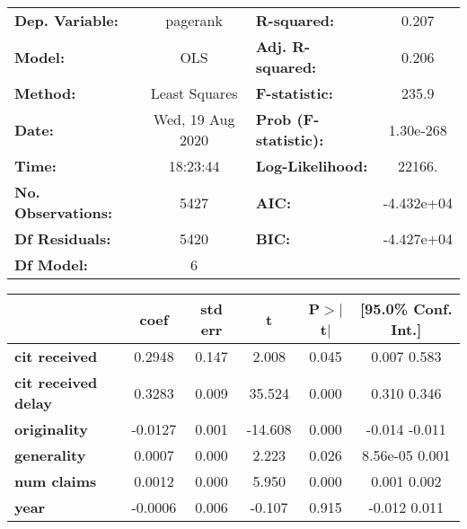 \begin{center}
\begin{tabular}{lclc}
\toprule
\textbf{Dep. Variable:}     &     pagerank     & \textbf{  R-squared:         } &      0.207    \\
\textbf{Model:}             &       OLS        & \textbf{  Adj. R-squared:    } &      0.206    \\
\textbf{Method:}            &  Least Squares   & \textbf{  F-statistic:       } &      235.9    \\
\textbf{Date:}              & Wed, 19 Aug 2020 & \textbf{  Prob (F-statistic):} &  1.30e-268    \\
\textbf{Time:}              &     18:23:44     & \textbf{  Log-Likelihood:    } &     22166.    \\
\textbf{No. Observations:}  &        5427      & \textbf{  AIC:               } &  -4.432e+04   \\
\textbf{Df Residuals:}      &        5420      & \textbf{  BIC:               } &  -4.427e+04   \\
\textbf{Df Model:}          &           6      & \textbf{                     } &               \\
\bottomrule
\end{tabular}
\begin{tabular}{lccccc}
                            & \textbf{coef} & \textbf{std err} & \textbf{t} & \textbf{P$>$$|$t$|$} & \textbf{[95.0\% Conf. Int.]}  \\
\midrule
\textbf{cit received}       &       0.2948  &        0.147     &     2.008  &         0.045        &         0.007     0.583       \\
\textbf{cit received delay} &       0.3283  &        0.009     &    35.524  &         0.000        &         0.310     0.346       \\
\textbf{originality}        &      -0.0127  &        0.001     &   -14.608  &         0.000        &        -0.014    -0.011       \\
\textbf{generality}         &       0.0007  &        0.000     &     2.223  &         0.026        &      8.56e-05     0.001       \\
\textbf{num claims}         &       0.0012  &        0.000     &     5.950  &         0.000        &         0.001     0.002       \\
\textbf{year}               &      -0.0006  &        0.006     &    -0.107  &         0.915        &        -0.012     0.011       \\
\bottomrule

\end{tabular}
\end{center}
